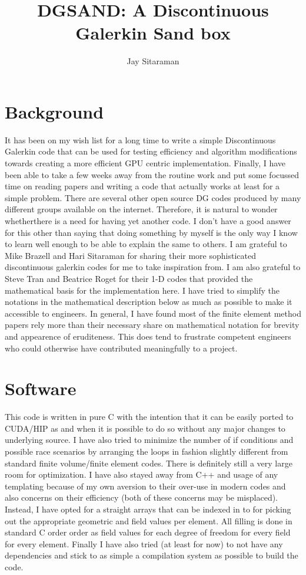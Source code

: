 \documentclass[11pt]{article}
\begin{document}
\title{DGSAND: A Discontinuous Galerkin Sand box }
\author{Jay Sitaraman}
\maketitle
\section{Background}
It has been on my wish list for a long time to write a simple Discontinuous Galerkin code that can be used
for testing efficiency and algorithm modifications towards creating a more efficient GPU centric implementation.
Finally, I have been able to take a few weeks away from the routine work and put some focussed time on reading
papers and writing a code that actually works at least for a simple problem. There are several other open
source DG codes produced by many different groups available on the internet. Therefore, it is natural to
wonder whetherthere is a need for having yet another code. I don't have a good answer for this other
than saying that doing something by myself is the only way I know to learn well enough to be able
to explain the same to others. I am grateful to Mike Brazell and Hari Sitaraman for sharing their more
sophisticated discontinuous galerkin codes for me to take inspiration from. I am also grateful to Steve Tran
and Beatrice Roget for their 1-D codes that provided the mathematical basis for the implementation here.
I have tried to simplify the notations in the mathematical description below as much as possible to make it
accessible to engineers. In general, I have found most of the finite element method papers rely more than
their necessary share on mathematical notation for brevity and appearence of eruditeness.
This does tend to frustrate competent engineers who could otherwise have contributed meaningfully to a project. 

\section{Software}
This code is written in pure C with the intention that it can be easily ported to CUDA/HIP as and when it is
possible to do so without any major changes to underlying source. I have also tried to minimize the number
of if conditions and possible race scenarios by arranging the loops in fashion slightly different
from standard finite volume/finite element codes. There is definitely still a very large room for optimization.
I have also stayed away from C++ and usage of any templating
because of my own aversion to their over-use in modern codes and also concerns on their efficiency
(both of these concerns may be misplaced). Instead, I have opted for a straight arrays that can be indexed in to
for picking out the appropriate geometric and field values per element. All filling is done in standard C order
order as field values for each degree of freedom for every field for every element. Finally I have also tried
(at least for now) to not have any dependencies and stick to as simple a compilation system as
possible to build the code. 
\end{document}
